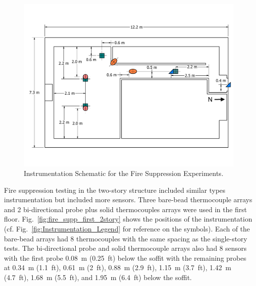 \documentclass[12pt,oneside]{book}
\begin{document}
\begin{figure}[!ht]
	\includegraphics[width=\columnwidth]{../Figures/Floor_Plans/PDFs/East_Structure/DelCo_2012_East_Structure_Instrumentation}
	\caption{Instrumentation Schematic for the Fire Suppression Experiments.}
	\label{fig:Fire_Suppression_Instrumentation_Dimensions}
\end{figure}

Fire suppression testing in the two-story structure included similar types instrumentation but included more sensors. Three bare-bead thermocouple arrays and 2 bi-directional probe plus solid thermocouples arrays were used in the first floor. Fig.~\ref{fig:fire_supp_first_2story} shows the positions of the instrumentation (cf. Fig.~\ref{fig:Instrumentation_Legend} for reference on the symbols). Each of the bare-bead arrays had 8 thermocouples with the same spacing as the single-story tests. The bi-directional probe and solid thermocouple arrays also had 8 sensors with the first probe 0.08~m (0.25~ft) below the soffit with the remaining probes at 0.34~m (1.1~ft), 0.61~m (2~ft), 0.88~m (2.9~ft), 1.15~m (3.7~ft), 1.42~m (4.7~ft), 1.68~m (5.5~ft), and 1.95~m (6.4~ft) below the soffit.
\end{document}
